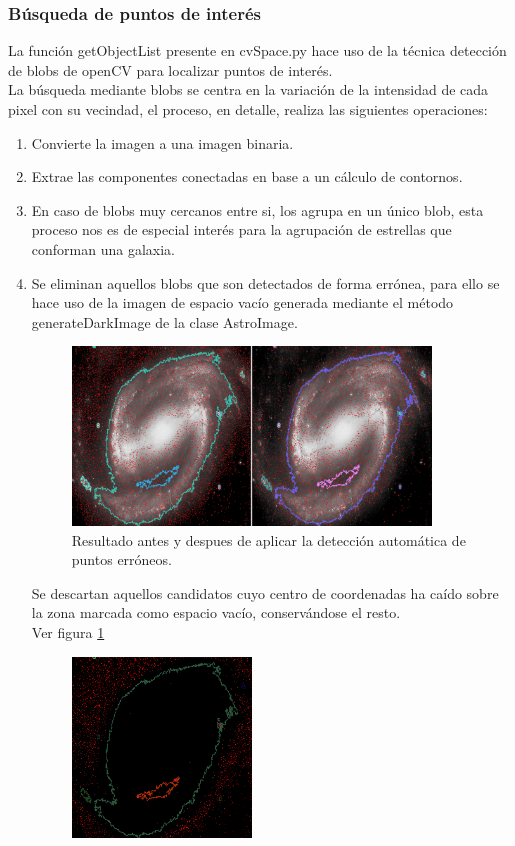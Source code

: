 	\subsubsection{Búsqueda de puntos de interés}
	La función getObjectList presente en cvSpace.py hace uso de la técnica detección de blobs de openCV para localizar puntos de interés.\\
	La búsqueda mediante blobs se centra en la variación de la intensidad de cada pixel con su vecindad, el proceso, en detalle, realiza las siguientes operaciones:
	\begin{enumerate}
		\item Convierte la imagen a una imagen binaria.
		\item Extrae las componentes conectadas en base a un cálculo de contornos.
		\item En caso de blobs muy cercanos entre si, los agrupa en un único blob, esta proceso nos es de especial interés para la agrupación de estrellas que conforman una galaxia.
		\item Se eliminan aquellos blobs que son detectados de forma errónea, para ello se hace uso de la imagen de espacio vacío generada mediante el método {\large generateDarkImage} de la clase AstroImage.\\
			\begin{figure}[!htb]
				\centering
				\includegraphics[width=0.9\textwidth]{images/removeBadPointsComparation.PNG}
				\caption{\label{fig:removePointsConparation}Resultado antes y despues de aplicar la detección automática de puntos erróneos.}
			\end{figure}
		Se descartan aquellos candidatos cuyo centro de coordenadas ha caído sobre la zona marcada como espacio vacío, conservándose el resto.\\ Ver figura \ref{fig:removePointsConparation}
			\begin{figure}[!htb]
				\centering
				\includegraphics[width=0.45\textwidth]{images/removeBadPointsDiference.PNG}

\end{figure}
\end{enumerate}
